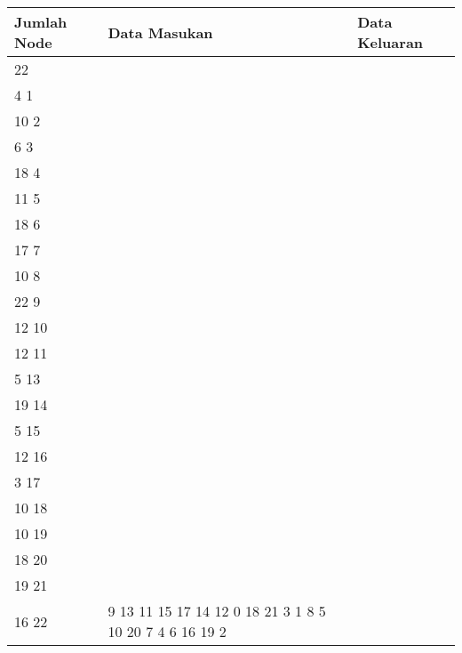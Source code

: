 	\begin{longtable}[Ht]{| p{} | p{} | p{} |}
		\hline
		Jumlah Node & Data Masukan                                                                                                                                                                                                                          & Data Keluaran                                                          \\ \hline
	22          & \begin{tabular}[c]{@{}l@{}}22\\ 4 1\\ 10 2\\ 6 3\\ 18 4\\ 11 5\\ 18 6\\ 17 7\\ 10 8\\ 22 9\\ 12 10\\ 12 11\\ 5 13\\ 19 14\\ 5 15\\ 12 16\\ 3 17\\ 10 18\\ 10 19\\ 18 20\\ 19 21\\ 16 22\end{tabular}                                  & 9 13 11 15 17 14 12 0 18 21 3 1 8 5 10 20 7 4 6 16 19 2                \\ \hline
	\end{longtable}
	\pagebreak
